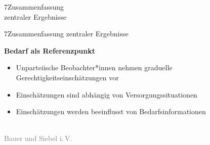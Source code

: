 \documentclass[xcolor=table,9pt,aspectratio=169]{beamer}
\begin{document}
\begin{frame}
\begin{overlayarea}{\textwidth}{0.81\paperheight}{
   \vspace*{11mm}
   \textcolor{uolblue}
   {7\hspace*{1em}Zusammenfassung\\\hspace*{1.5em}zentraler Ergebnisse}
}
\end{overlayarea}
\end{frame}


\begin{frame}{\vspace*{10mm}7\hspace*{1em}Zusammenfassung zentraler Ergebnisse}
\begin{multicols}{2}
   \textbf{Bedarf als Referenzpunkt}
   \medskip
   \begin{itemize}
   \item[(1)] Unparteiische Beobachter*innen nehmen graduelle Gerechtigkeitseinschätzungen vor
   \item[(2)] Einschätzungen sind abhängig von Versorgungssituationen
   \item[(3)] Einschätzungen werden beeinflusst von Bedarfsinformationen
\end{itemize}
   \vfill
   \begin{center}
      \\
      \textcolor{gray}{Bauer und Siebel i.\,V.}
   \end{center}
\end{multicols}
\end{frame}
\end{document}
